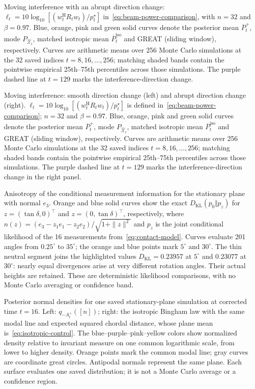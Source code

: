 \caption{Moving interference with an abrupt direction change: $\ell_t=10\log_{10}[(w_t^{\mathrm H}R_tw_t)/p_t^\star]$ in~\eqref{eq:beam-power-comparison}, with $n=32$ and $\beta=0.97$. Blue, orange, pink and green solid curves denote the posterior mean $\overline P_t^+$, mode $P_{\widehat{\mathcal X}_t}$, matched isotropic mean $\overline P_t^{\mathrm{iso}}$ and GREAT (sliding window), respectively. Curves are arithmetic means over 256 Monte Carlo simulations at the 32 saved indices $t=8,16,\ldots,256$; matching shaded bands contain the pointwise empirical 25th--75th percentiles across those simulations. The purple dashed line at $t=129$ marks the interference-direction change.}

\caption{Moving interference: smooth direction change (left) and abrupt direction change (right). $\ell_t=10\log_{10}[(w_t^{\mathrm H}R_tw_t)/p_t^\star]$ is defined in~\eqref{eq:beam-power-comparison}; $n=32$ and $\beta=0.97$. Blue, orange, pink and green solid curves denote the posterior mean $\overline P_t^+$, mode $P_{\widehat{\mathcal X}_t}$, matched isotropic mean $\overline P_t^{\mathrm{iso}}$ and GREAT (sliding window), respectively. Curves are arithmetic means over 256 Monte Carlo simulations at the 32 saved indices $t=8,16,\ldots,256$; matching shaded bands contain the pointwise empirical 25th--75th percentiles across those simulations. The purple dashed line at $t=129$ marks the interference-direction change in the right panel.}

\caption{Anisotropy of the conditional measurement information for the stationary plane with normal $e_3$. Orange and blue solid curves show the exact $D_{\mathrm{KL}}(p_0\Vert p_z)$ for $z=(\tan\delta,0)^\top$ and $z=(0,\tan\delta)^\top$, respectively, where $n(z)=(e_3-z_1e_1-z_2e_2)/\sqrt{1+\|z\|^2}$ and $p_z$ is the joint conditional likelihood of the 16 measurements from~\eqref{eq:contact-model}. Curves evaluate 201 angles from $0.25^\circ$ to $35^\circ$; the orange and blue points mark $5^\circ$ and $30^\circ$. The thin neutral segment joins the highlighted values $D_{\mathrm{KL}}=0.23957$ at $5^\circ$ and $0.23077$ at $30^\circ$: nearly equal divergences arise at very different rotation angles. Their actual heights are retained. These are deterministic likelihood comparisons, with no Monte Carlo averaging or confidence band.}

\caption{Posterior normal densities for one saved stationary-plane simulation at corrected time $t=16$. Left: $q_{-A_t^+}([n])$; right: the isotropic Bingham law with the same modal line and expected squared chordal distance, whose plane mean is~\eqref{eq:isotropic-control}. The blue--purple--pink--yellow colors show normalized density relative to invariant measure on one common logarithmic scale, from lower to higher density. Orange points mark the common modal line; gray curves are coordinate great circles. Antipodal normals represent the same plane. Each surface evaluates one saved distribution; it is not a Monte Carlo average or a confidence region.}


